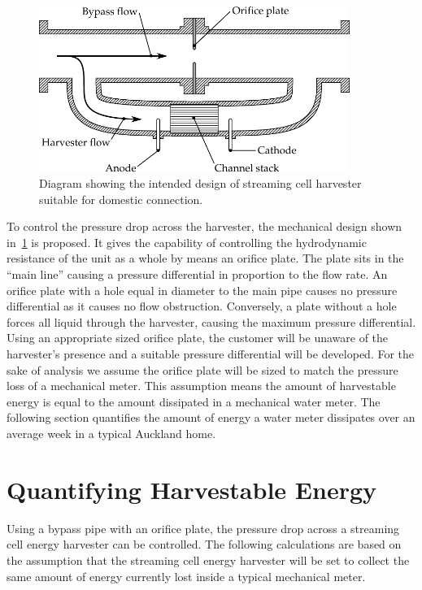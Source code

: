    \begin{figure}
      \centering
      \includegraphics[width=0.9\textwidth]{content/pt1/02-WirelessWaterMeter/graphics/harvester}
      \caption{\label{fig:Diagram_harvester}Diagram showing the intended design of streaming cell harvester suitable for domestic connection.}
    \end{figure}
    To control the pressure drop across the harvester, the mechanical design shown in~\cref{fig:Diagram_harvester} is proposed.
    It gives the capability of controlling the hydrodynamic resistance of the unit as a whole by means an orifice plate.
    The plate sits in the ``main line'' causing a pressure differential in proportion to the flow rate.
    An orifice plate with a hole equal in diameter to the main pipe causes no pressure differential as it causes no flow obstruction.
    Conversely, a plate without a hole forces all liquid through the harvester, causing the maximum pressure differential.
    Using an appropriate sized orifice plate, the customer will be unaware of the harvester's presence and a suitable pressure differential will be developed.
    For the sake of analysis we assume the orifice plate will be sized to match the pressure loss of a mechanical meter.
    This assumption means the amount of harvestable energy is equal to the amount dissipated in a mechanical water meter.
    The following section quantifies the amount of energy a water meter dissipates over an average week in a typical Auckland home.


  \section{Quantifying Harvestable Energy}
  \label{sect:part1-WirelessWaterMeter-QuantifyingHarvestableEnergy}

    Using a bypass pipe with an orifice plate, the pressure drop across a streaming cell energy harvester can be controlled.
    The following calculations are based on the assumption that the streaming cell energy harvester will be set to collect the same amount of energy currently lost inside a typical mechanical meter.

